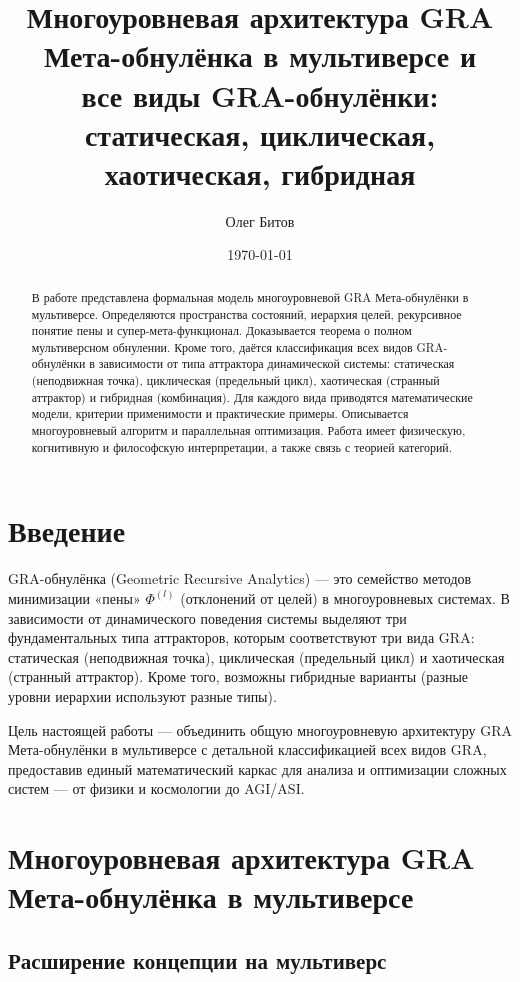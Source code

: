 \documentclass[12pt,a4paper]{article}
\title{Многоуровневая архитектура GRA Мета-обнулёнка в мультиверсе и\\ все виды GRA-обнулёнки: статическая, циклическая, хаотическая, гибридная}
\author{Олег Битов}
\date{\today}
\begin{document}
\maketitle

\begin{abstract}
В работе представлена формальная модель многоуровневой GRA Мета-обнулёнки в мультиверсе. Определяются пространства состояний, иерархия целей, рекурсивное понятие пены и супер-мета-функционал. Доказывается теорема о полном мультиверсном обнулении. Кроме того, даётся классификация всех видов GRA-обнулёнки в зависимости от типа аттрактора динамической системы: статическая (неподвижная точка), циклическая (предельный цикл), хаотическая (странный аттрактор) и гибридная (комбинация). Для каждого вида приводятся математические модели, критерии применимости и практические примеры. Описывается многоуровневый алгоритм и параллельная оптимизация. Работа имеет физическую, когнитивную и философскую интерпретации, а также связь с теорией категорий.
\end{abstract}

\section{Введение}

GRA-обнулёнка (Geometric Recursive Analytics) — это семейство методов минимизации «пены» \(\Phi^{(l)}\) (отклонений от целей) в многоуровневых системах. В зависимости от динамического поведения системы выделяют три фундаментальных типа аттракторов, которым соответствуют три вида GRA: статическая (неподвижная точка), циклическая (предельный цикл) и хаотическая (странный аттрактор). Кроме того, возможны гибридные варианты (разные уровни иерархии используют разные типы).

Цель настоящей работы — объединить общую многоуровневую архитектуру GRA Мета-обнулёнки в мультиверсе с детальной классификацией всех видов GRA, предоставив единый математический каркас для анализа и оптимизации сложных систем — от физики и космологии до AGI/ASI.

\section{Многоуровневая архитектура GRA Мета-обнулёнка в мультиверсе}

\subsection{Расширение концепции на мультиверс}
\end{document}
